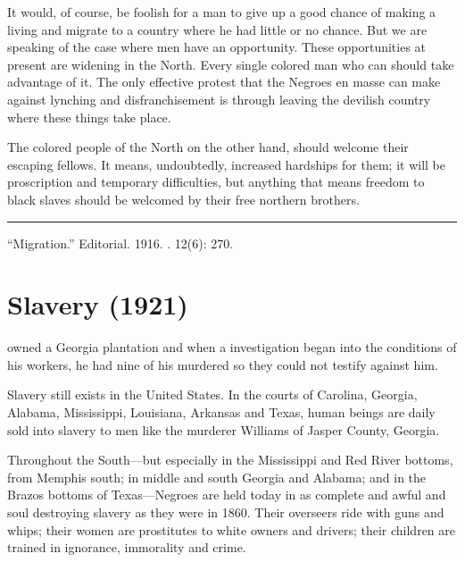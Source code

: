 \documentclass[letterpaper,10pt,english]{jupyterBook}
\begin{document}
\sphinxAtStartPar
It would, of course, be foolish for a man to give up a good chance of making a living and migrate to a country where he had little or no chance. But we are speaking of the case where men have an opportunity. These opportunities at present are widening in the North. Every single colored man who can should take advantage of it. The only effective protest that the Negroes en masse can make against lynching and dis­franchisement is through leaving the devilish country where these things take place.

\sphinxAtStartPar
The colored people of the North on the other hand, should welcome their escaping fellows. It means, undoubtedly, increased hardships for them; it will be proscription and temporary difficulties, but anything that means freedom to black slaves should be welcomed by their free northern brothers.


\bigskip\hrule\bigskip


\sphinxAtStartPar
{} “Migration.” Editorial. 1916. . 12(6): 270.


\section{Slavery (1921)}
\label{\detokenize{Volumes/24/01/slavery:slavery-1921}}\label{\detokenize{Volumes/24/01/slavery::doc}}
\begin{sphinxShadowBox}
\sphinxstylesidebartitle{}

\sphinxAtStartPar
{} owned a Georgia plantation and when a investigation began into the conditions of his workers, he had nine of his  murdered so they could not testify against him.
\end{sphinxShadowBox}

\sphinxAtStartPar
Slavery still exists in the United States. In the courts of Carolina, Georgia, Alabama, Mississippi, Louisiana, Arkansas and Texas, human beings are daily sold into slavery to men like the murderer Williams of Jasper County, Georgia.

\sphinxAtStartPar
Throughout the South—but especially in the Mississippi and Red River bottoms, from Memphis south; in middle and south Georgia and Ala­bama; and in the Brazos bottoms of Texas—Negroes are held today in as complete and awful and soul destroying slavery as they were in 1860. Their overseers ride with guns and whips; their women are prostitutes to white owners and drivers; their children are trained in ignorance, im­morality and crime.
\end{document}
